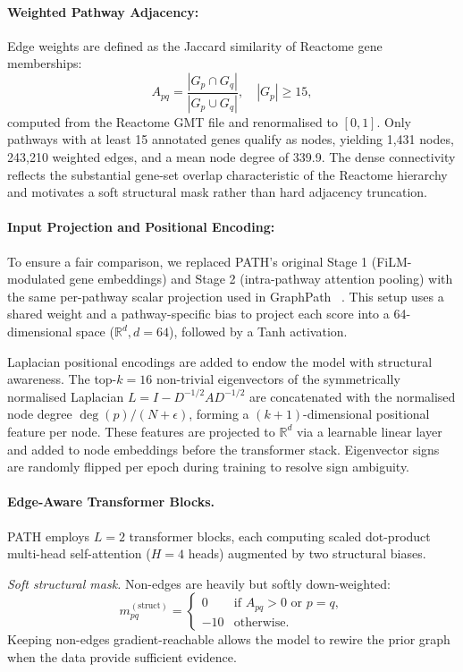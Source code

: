 \documentclass[sigconf]{acmart}
\begin{document}
\paragraph{Weighted Pathway Adjacency:}
Edge weights are defined as the Jaccard similarity of Reactome gene
memberships:
\begin{equation}
A_{pq} = \frac{|G_p \cap G_q|}{|G_p \cup G_q|},
\quad |G_p| \geq 15,
\end{equation}
computed from the Reactome GMT file and renormalised to $[0,1]$. Only
pathways with at least 15 annotated genes qualify as nodes, yielding
1,431 nodes, 243,210 weighted edges, and a mean node degree of 339.9.
The dense connectivity reflects the substantial gene-set overlap
characteristic of the Reactome hierarchy and motivates a soft
structural mask rather than hard adjacency truncation.

\paragraph{Input Projection and Positional Encoding:}
To ensure a fair comparison, we replaced PATH's original Stage 1 (FiLM-modulated gene embeddings) and Stage 2 (intra-pathway attention pooling) with the same per-pathway scalar projection used in GraphPath ~\cite{perez2018film}. This setup uses a shared weight and a pathway-specific bias to project each score into a 64-dimensional space ($\mathbb{R}^d, d = 64$), followed by a Tanh activation.

Laplacian positional encodings are added to endow the model with
structural awareness. The top-$k = 16$ non-trivial eigenvectors of
the symmetrically normalised Laplacian
$L = I - D^{-1/2}AD^{-1/2}$ are concatenated with the normalised node
degree $\deg(p)/(N + \epsilon)$, forming a $(k{+}1)$-dimensional
positional feature per node. These features are projected to
$\mathbb{R}^d$ via a learnable linear layer and added to node
embeddings before the transformer stack. Eigenvector signs are
randomly flipped per epoch during training to resolve sign ambiguity.

\paragraph{Edge-Aware Transformer Blocks.}
PATH employs $L = 2$ transformer blocks, each computing scaled
dot-product multi-head self-attention ($H = 4$ heads) augmented by
two structural biases.

\emph{Soft structural mask.} Non-edges are heavily but softly
down-weighted:
\begin{equation}
m^{(\text{struct})}_{pq} = \begin{cases}
0   & \text{if } A_{pq} > 0 \text{ or } p = q, \\
-10 & \text{otherwise.}
\end{cases}
\end{equation}
Keeping non-edges gradient-reachable allows the model to rewire the
prior graph when the data provide sufficient evidence.
\end{document}
